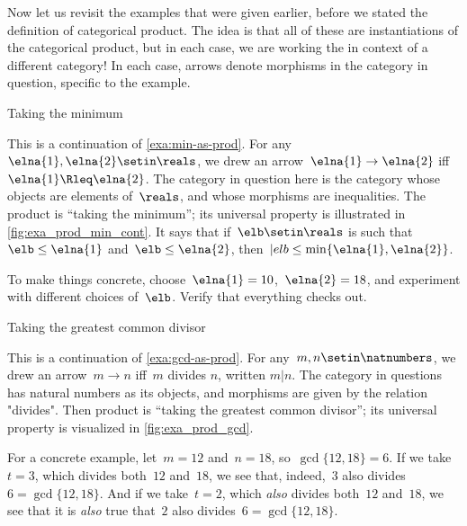 Now let us revisit the examples that were given earlier, before we stated the definition of categorical product.
The idea is that all of these are instantiations of the categorical product, but in each case, we are working the in context of a different category!
In each case, arrows denote morphisms in the category in question, specific to the example.

\begin{marginfigure}
    \centering
    \caption{Taking the minimum}
    \label{fig:exa_prod_min_cont}
\end{marginfigure}

\begin{example}
    \label{exa:min-as-prod-cont}
    This is a continuation of \cref{exa:min-as-prod}.
    For any~$\elna{1},\elna{2}\setin \reals$, we drew an arrow~$\elna{1}\to \elna{2}$ iff~$\elna{1}\Rleq \elna{2}$.
    The category in question here is the category whose objects are elements of~$\reals$, and whose morphisms are inequalities.
    The product is ``taking the minimum'';
    its universal property is illustrated in \cref{fig:exa_prod_min_cont}.
    It says that if~$\elb \setin \reals$ is such that~$\elb \leq \elna{1}$ and~$\elb \leq \elna{2}$, then~$|elb \leq \min \{ \elna{1}, \elna{2} \}$.

    To make things concrete, choose~$\elna{1} = 10$,~$\elna{2} = 18$, and experiment with different choices of~$\elb$.
    Verify that everything checks out.
\end{example}

\begin{marginfigure}
    \centering
    \caption{Taking the greatest common divisor}
    \label{fig:exa_prod_gcd_cont}
\end{marginfigure}

\begin{example}
    \label{exa:gcd-as-prod-cont}
    This is a continuation of \cref{exa:gcd-as-prod}.
    For any~$m, n \setin \natnumbers$, we drew an arrow~$m \to n$ iff~$m$ divides $n$, written $m | n$.
    The category in questions has natural numbers as its objects, and morphisms are given by the relation "divides".
    Then product is ``taking the greatest common divisor''; its universal property is visualized in \cref{fig:exa_prod_gcd}.

    For a concrete example, let~$m = 12$ and~$n = 18$, so~$\gcd \{12, 18 \} = 6$.
    If we take~$t = 3$, which divides both~$12$ and~$18$, we see that, indeed,~$3$ also divides~$6 = \gcd \{12, 18 \}$.
    And if we take~$t = 2$, which \emph{also} divides both~$12$ and~$18$, we see that it is \emph{also} true that~$2$ also divides~$6 = \gcd \{12, 18 \}$.
\end{example}

